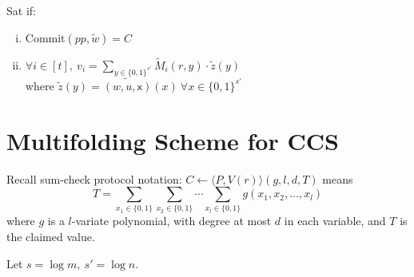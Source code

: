 \documentclass{article}
\theoremstyle{definition}
\begin{document}
Sat if:
\begin{enumerate}[i.]
	\item $\text{Commit}(pp, \widetilde{w}) = C$
	\item $\forall i \in [t],~ v_i = \sum_{y \in \{0,1\}^{s'}} \widetilde{M}_i(r, y) \cdot \widetilde{z}(y)$\\
		where $\widetilde{z}(y) = \widetilde{(w, u, \mathsf{x})}(x) ~\forall x \in \{0, 1\}^{s'}$
\end{enumerate}


\section{Multifolding Scheme for CCS}
Recall sum-check protocol notation: \underline{$C \leftarrow \langle P, V(r) \rangle (g, l, d, T)$} means
$$T=\sum_{x_1 \in \{0,1\}} \sum_{x_2 \in \{0,1\}} \cdots \sum_{x_l \in \{0,1\}} g(x_1, x_2, \ldots, x_l)$$
where $g$ is a $l$-variate polynomial, with degree at most $d$ in each variable, and $T$ is the claimed value.

\vspace{1cm}

Let $s= \log m,~ s'= \log n$.
\end{document}
